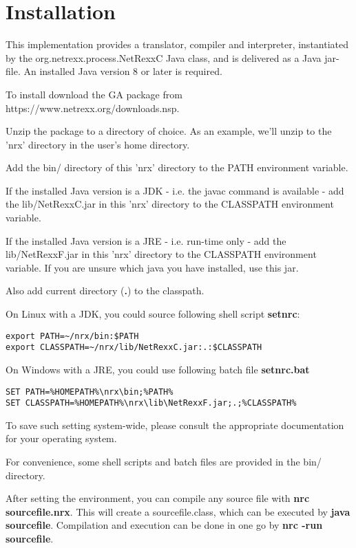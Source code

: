 \section{Installation}
This \nr{} implementation provides a translator, compiler and interpreter, instantiated by the 
org.netrexx.process.NetRexxC Java class, and is delivered as a Java jar-file. An installed Java version 8 or later is required.

To install \nr{} download the GA package from \linebreak https://www.netrexx.org/downloads.nsp.

Unzip the package to a directory of choice. As an example, we'll unzip to the 'nrx' directory in the user's home directory.

Add the bin/ directory of this 'nrx' directory to the PATH environment variable.

If the installed Java version is a JDK - i.e. the javac command is available - add the lib/NetRexxC.jar in this 'nrx' directory to the CLASSPATH environment variable.

If the installed Java version is a JRE - i.e. run-time only - add the lib/NetRexxF.jar in this 'nrx' directory to the CLASSPATH environment variable. If you are unsure which java you have installed, use this jar.

Also add current directory (\textbf{.}) to the classpath.

On Linux with a JDK, you could source following shell script \textbf{setnrc}:

\begin{lstlisting}
export PATH=~/nrx/bin:$PATH
export CLASSPATH=~/nrx/lib/NetRexxC.jar:.:$CLASSPATH
\end{lstlisting}

On Windows with a JRE, you could use following batch file \textbf{setnrc.bat}

\begin{lstlisting}
SET PATH=%HOMEPATH%\nrx\bin;%PATH%
SET CLASSPATH=%HOMEPATH%\nrx\lib\NetRexxF.jar;.;%CLASSPATH%
\end{lstlisting}

To save such setting system-wide, please consult the appropriate documentation for your operating system.


For convenience, some shell scripts and batch files are provided in the bin/ directory.

After setting the environment, you can compile any \nr{} source file with \textbf{nrc sourcefile.nrx}. This will create a sourcefile.class, which can be executed by \textbf{java sourcefile}.
Compilation and execution can be done in one go by \textbf{nrc -run sourcefile}.


